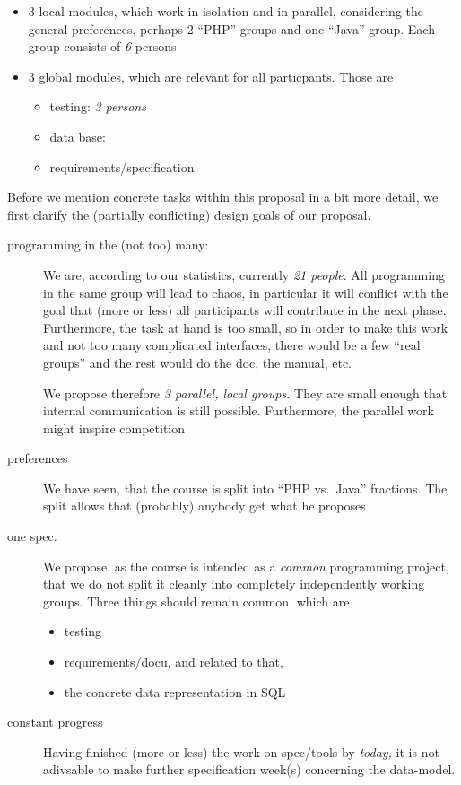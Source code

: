 \documentclass[11pt,handout]{handout}
\begin{document}
\begin{itemize}
\item 3 local modules, which work in isolation and in parallel, considering
  the general preferences, perhaps 2 ``PHP'' groups and one ``Java'' group.
  Each group consists of \emph{6} persons
\item 3 global modules, which are relevant for all particpants. Those are
  \begin{itemize}
  \item testing: \emph{3 persons}
  \item data base: 
  \item requirements/specification
  \end{itemize}
\end{itemize}





Before we mention concrete tasks within this proposal in a bit more detail,
we first clarify the (partially conflicting) design goals of our proposal.
\begin{description}
\item[programming in the (not too) many:] We are, according to our
  statistics, currently \emph{21 people}. All programming in the same group
  will lead to chaos, in particular it will conflict with the goal that
  (more or less) all participants will contribute in the next phase.
  Furthermore, the task at hand is too small, so in order to make this work
  and not too many complicated interfaces, there would be a few ``real
  groups'' and the rest would do the doc, the manual, etc. 
  
  We propose therefore \emph{3 parallel, local groups.} They are small
  enough that internal communication is still possible. Furthermore, the
  parallel work might inspire competition
\item[preferences] We have seen, that the course is split into ``PHP vs.\ 
  Java'' fractions. The split allows that (probably) anybody get what he
  proposes
\item[one spec.] We propose, as the course is intended as a \emph{common}
  programming project, that we do not split it cleanly into completely
  independently working groups. Three things should remain common, which are
  \begin{itemize}
  \item testing
  \item requirements/docu, and related to that, 
  \item the concrete data representation in SQL
  \end{itemize}
\item[constant progress] Having finished (more or less) the work on
  spec/tools by \emph{today,} it is not adivsable to make further
  specification week(s) concerning the data-model.
\end{description}
\end{document}
